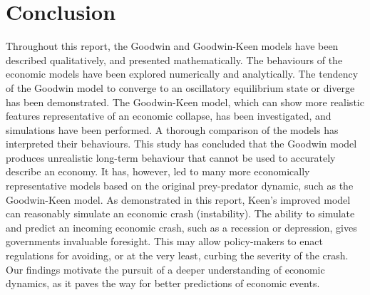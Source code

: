 \documentclass[12pt, centerh1]{article}
\begin{document}


\section{Conclusion}
Throughout this report, the Goodwin and Goodwin-Keen models have been described qualitatively, and presented mathematically. The behaviours of the economic models have been explored numerically and analytically. The tendency of the Goodwin model to converge to an oscillatory equilibrium state or diverge has been demonstrated. The Goodwin-Keen model, which can show more realistic features representative of an economic collapse, has been investigated, and simulations have been performed. A thorough comparison of the models has interpreted their behaviours. This study has concluded that the Goodwin model produces unrealistic long-term behaviour that cannot be used to accurately describe an economy. It has, however, led to many more economically representative models based on the original prey-predator dynamic, such as the Goodwin-Keen model. As demonstrated in this report, Keen's improved model can reasonably simulate an economic crash (instability). The ability to simulate and predict an incoming economic crash, such as a recession or depression, gives governments invaluable foresight. This may allow policy-makers to enact regulations for avoiding, or at the very least, curbing the severity of the crash. Our findings motivate the pursuit of a deeper understanding of economic dynamics, as it paves the way for better predictions of economic events.
\end{document}
